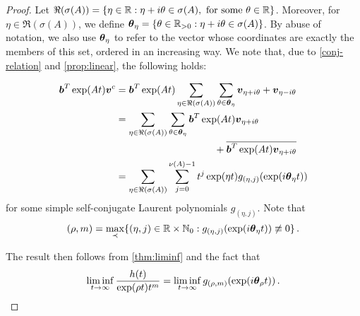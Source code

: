 \begin{proof}
  Let
  $\Re(\sigma(A))=\lbrace \eta\in\mathbb{R}:
  \eta+i\theta\in\sigma(A),\mbox{ for some }\theta\in\mathbb{R}
  \rbrace$. Moreover, for $\eta\in\Re(\sigma(A))$, we define
  $\boldsymbol{\theta}_{\eta}=\lbrace \theta\in\mathbb{R}_{>0}:
  \eta+i\theta \in\sigma(A) \rbrace$. By abuse of notation, we also
  use $\boldsymbol{\theta}_{\eta}$ to refer to the vector whose
  coordinates are exactly the members of this set, ordered in an
  increasing way. We note that, due to \cref{conj-relation}
  and \cref{prop:linear}, the
  following holds:

\begin{align*}
\boldsymbol{b}^{T}\exp(At)\boldsymbol{v}^{c} &= \boldsymbol{b}^{T} \exp(At) \sum\limits_{\eta\in\Re(\sigma(A))} \sum\limits_{\theta\in\boldsymbol{\theta}_{\eta}} \boldsymbol{v}_{\eta+i\theta}+\boldsymbol{v}_{\eta-i\theta} \\
&= \sum\limits_{\eta\in\Re(\sigma(A))} \sum\limits_{\theta\in\boldsymbol{\theta}_{\eta}} \boldsymbol{b}^{T} \exp(At) \boldsymbol{v}_{\eta+i\theta} \\
& \qquad \qquad \qquad \qquad \qquad + \overline{\boldsymbol{b}^{T} \exp(At) \boldsymbol{v}_{\eta+i\theta}} \\
& = \sum\limits_{\eta\in\Re(\sigma(A))} \sum\limits_{j=0}^{\nu(A)-1} t^{j}\exp(\eta t)  g_{(\eta,j)}( \exp(i\boldsymbol{\theta}_{\eta}t) )
\end{align*}
for some simple self-conjugate Laurent polynomials
$g_{(\eta,j)}$.
Note that
\begin{equation*}
(\rho,m)=\max\limits_{\prec} \lbrace (\eta,j)\in\mathbb{R}\times
\mathbb{N}_{0}: g_{(\eta,j)}(\exp(i\boldsymbol{\theta}_{\eta} t)) \not
\equiv 0 \rbrace \, .
\end{equation*}

The result then follows from \cref{thm:liminf} and the fact
that
\begin{align*}
\liminf\limits_{t\rightarrow\infty} \frac{h(t)}{\exp(\rho t)t^{m}}=
  \liminf\limits_{t\rightarrow\infty}
  g_{(\rho,m)}(\exp(i\boldsymbol{\theta}_{\rho} t)) \, .
\end{align*}
\end{proof}
